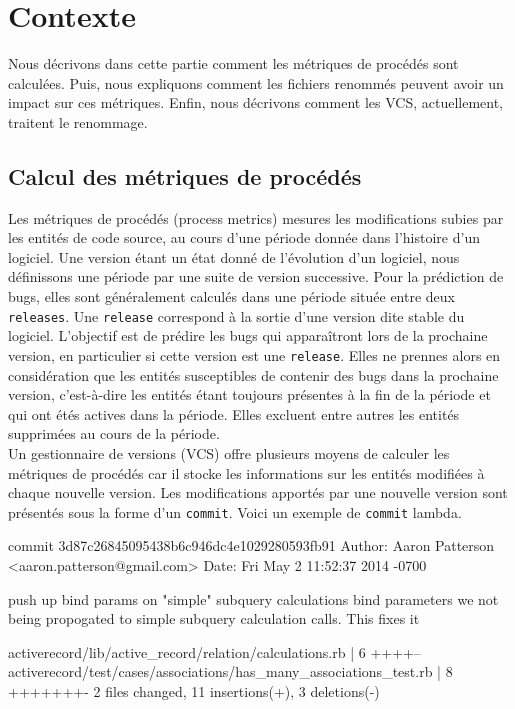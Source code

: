 \section{Contexte}
\label{sec:metriques}

Nous décrivons dans cette partie comment les métriques de procédés sont calculées. Puis, nous expliquons comment les fichiers renommés peuvent avoir un impact sur ces métriques. Enfin, nous décrivons comment les VCS, actuellement, traitent le renommage.

\subsection{Calcul des métriques de procédés}

Les métriques de procédés (process metrics) mesures les modifications subies par les entités de code source, au cours d'une période donnée dans l'histoire d'un logiciel. Une version étant un état donné de l'évolution d'un logiciel, nous définissons une période par une suite de version successive. Pour la prédiction de bugs, elles sont généralement calculés dans une période située entre deux \texttt{releases}. Une \texttt{release} correspond à la sortie d'une version dite stable du logiciel. L'objectif est de prédire les bugs qui apparaîtront lors de la prochaine version, en particulier si cette version est une \texttt{release}. Elles ne prennes alors en considération que les entités susceptibles de contenir des bugs dans la prochaine version, c'est-à-dire les entités étant toujours présentes à la fin de la période et qui ont étés actives dans la période. Elles excluent entre autres les entités supprimées au cours de la période.\\

Un gestionnaire de versions (VCS) offre plusieurs moyens de calculer les métriques de procédés car il stocke les informations sur les entités modifiées à chaque nouvelle version. Les modifications apportés par une nouvelle version sont présentés sous la forme d'un \texttt{commit}. Voici un exemple de \texttt{commit} lambda.\\

\begingroup
	\fontsize{8pt}{12pt}\selectfont
	\centering\begin{boxedverbatim}
	commit 3d87c26845095438b6c946dc4e1029280593fb91	
	Author: Aaron Patterson <aaron.patterson@gmail.com>
	Date:   Fri May 2 11:52:37 2014 -0700

	    push up bind params on "simple" subquery calculations 
	    bind parameters we not being propogated to simple subquery 
	    calculation calls. This fixes it

	 activerecord/lib/active_record/relation/calculations.rb            |    6 ++++--
	 activerecord/test/cases/associations/has_many_associations_test.rb |    8 +++++++-
	 2 files changed, 11 insertions(+), 3 deletions(-)
	\end{boxedverbatim}
\endgroup
\linebreak

